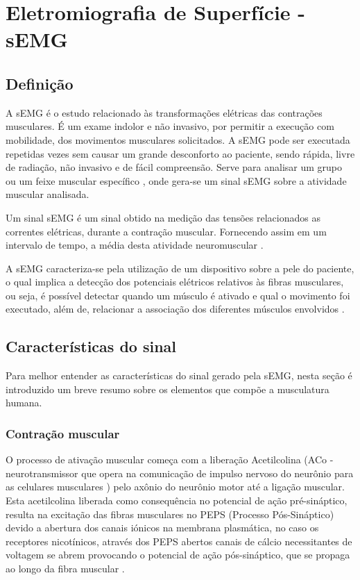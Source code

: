 \chapter{Eletromiografia de Superfície - sEMG}
\section{Definição}
A sEMG é o estudo relacionado às transformações elétricas das contrações musculares. É um exame indolor e não invasivo, por permitir a execução com mobilidade, dos movimentos musculares solicitados. A sEMG pode ser executada repetidas vezes sem causar um grande desconforto ao paciente, sendo rápida, livre de radiação, não invasivo e de fácil compreensão. Serve para analisar um grupo ou um feixe muscular específico \cite{de2010eletromiografia}, onde gera-se um sinal sEMG sobre a atividade muscular analisada.

Um sinal sEMG é um sinal obtido na medição das tensões relacionados as correntes elétricas, durante a contração muscular. Fornecendo assim em um intervalo de tempo, a média desta atividade neuromuscular \cite{reaz2006techniques}.

A sEMG caracteriza-se pela utilização de um dispositivo sobre a pele do paciente, o qual implica a detecção dos potenciais elétricos relativos às fibras musculares, ou seja, é possível detectar quando um músculo é ativado e qual o movimento foi executado, além de, relacionar a associação dos diferentes músculos envolvidos \cite{botelho2010avaliaccao}.

\section{Características do sinal}
Para melhor entender as características do sinal gerado pela sEMG, nesta seção é introduzido um breve resumo sobre os elementos que compõe a musculatura humana.

\subsection{Contração muscular}
O processo de ativação muscular começa com a liberação Acetilcolina (ACo - neurotransmissor que opera na comunicação de impulso nervoso do neurônio para as celulares musculares \cite{flores2005estructura}) pelo axônio do neurônio motor até a ligação muscular. Esta acetilcolina liberada como consequência no potencial de ação pré-sináptico, resulta na excitação das fibras musculares no PEPS (Processo Pós-Sináptico) devido a abertura dos canais iónicos na membrana plasmática, no caso os receptores nicotínicos, através dos PEPS abertos canais de cálcio necessitantes de voltagem se abrem provocando o potencial de ação pós-sináptico, que se propaga ao longo da fibra muscular \cite{da2005detecccao}.

